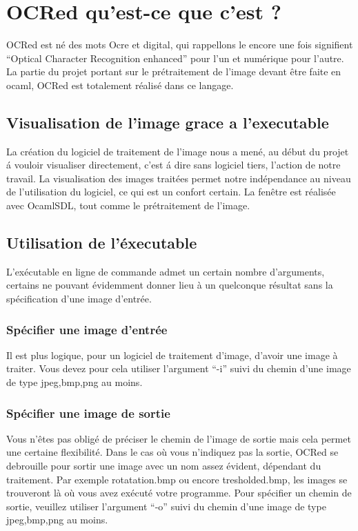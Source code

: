 \chapter{ OCRed qu'est-ce que c'est ? }
 OCRed est n\'e des mots Ocre et digital, qui rappellons le encore une fois
 signifient ``Optical Character Recognition enhanced'' pour l'un et
 num\'erique pour l'autre. La partie du projet portant sur le
 pr\'etraitement de l'image devant \^etre faite en ocaml, OCRed est
 totalement r\'ealis\'e dans ce langage.

\section{ Visualisation de l'image grace a l'executable }
 La cr\'eation du logiciel de traitement de l'image nous a men\'e, au
 d\'ebut du projet \'a vouloir visualiser directement, c'est \'a dire
 sans logiciel tiers, l'action de notre travail.
 La visualisation des images trait\'ees permet notre ind\'ependance
 au niveau de l'utilisation du logiciel, ce qui est un confort certain.
 La fen\^etre est r\'ealis\'ee avec OcamlSDL, tout comme le pr\'etraitement
 de l'image.

\section{ Utilisation de l'\'executable }
 L'ex\'ecutable en ligne de commande admet un certain nombre d'arguments,
 certains ne pouvant \'evidemment donner lieu \`a un quelconque r\'esultat
 sans la sp\'ecification d'une image d'entr\'ee.
\subsection{ Sp\'ecifier une image d'entr\'ee }
 Il est plus logique, pour un logiciel de traitement d'image, d'avoir
 une image \`a traiter. Vous devez pour cela utiliser l'argument ``-i''
 suivi du chemin d'une image de type jpeg,bmp,png au moins.
\subsection{ Sp\'ecifier une image de sortie }
 Vous n'\^etes pas oblig\'e de pr\'eciser le chemin de l'image de sortie
 mais cela permet une certaine flexibilit\'e. Dans le cas o\`u vous
 n'indiquez pas la sortie, OCRed se debrouille pour sortir une image
 avec un nom assez \'evident, d\'ependant du traitement. Par exemple
 rotatation.bmp ou encore tresholded.bmp, les images se trouveront l\`a
 o\`u vous avez ex\'ecut\'e votre programme. Pour sp\'ecifier un chemin de
 sortie, veuillez utiliser l'argument ``-o'' suivi du chemin d'une image
de type jpeg,bmp,png au moins.
